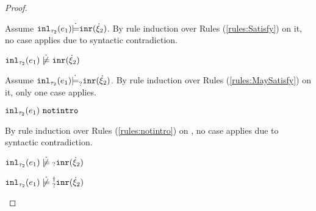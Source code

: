 \begin{proof}
\begin{byCases}
\begin{byCases}
        Assume $\mathtt{inl}_{\tau_2}({e_1}) \dot{\models} \mathtt{inr}(\dot{\xi}_2)$. By rule induction over Rules (\ref{rules:Satisfy}) on it, no case applies due to syntactic contradiction.
        \begin{pfsteps*}
        \item $\cnotsatisfy{\hinl{\tau_2}{e_1}}{\cinr{\hxi_2}}$  
        \end{pfsteps*}
        Assume $\mathtt{inl}_{\tau_2}({e_1}) \dot{\models}_{?} \mathtt{inr}(\dot{\xi}_2)$. By rule induction over Rules (\ref{rules:MaySatisfy}) on it, only one case applies.
        \begin{byCases}
        \item[\text{(\ref{rule:CMSNotIntro})}]
            \begin{pfsteps*}
            \item $\mathtt{inl}_{\tau_2}({e_1}) ~\mathtt{notintro}$  
            \end{pfsteps*}
            By rule induction over Rules (\ref{rules:notintro}) on , no case applies due to syntactic contradiction.
        \end{byCases}
        \begin{pfsteps*}
        \item $\cnotmaysatisfy{\hinl{\tau_2}{e_1}}{\cinr{\hxi_2}}$  
        \item $\cnotsatisfyormay{\hinl{\tau_2}{e_1}}{\cinr{\hxi_2}}$ 
        \end{pfsteps*}
        

\end{byCases}
\end{byCases}
\end{proof}
